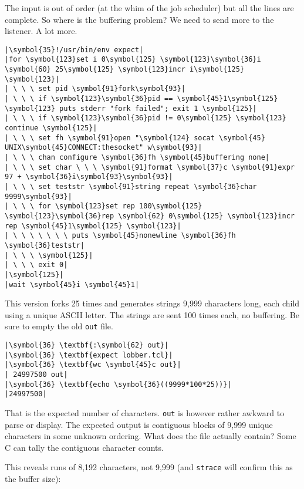 \documentclass[10pt,a4paper]{article}
\begin{document}
The input is out of order (at the whim of the job scheduler) but all the
lines are complete. So where is the buffering problem? We need to send
more to the listener. A lot more.

\begin{lstlisting}
|\symbol{35}!/usr/bin/env expect|
|for \symbol{123}set i 0\symbol{125} \symbol{123}\symbol{36}i \symbol{60} 25\symbol{125} \symbol{123}incr i\symbol{125} \symbol{123}|
| \ \ \ set pid \symbol{91}fork\symbol{93}|
| \ \ \ if \symbol{123}\symbol{36}pid == \symbol{45}1\symbol{125} \symbol{123} puts stderr "fork failed"; exit 1 \symbol{125}|
| \ \ \ if \symbol{123}\symbol{36}pid != 0\symbol{125} \symbol{123} continue \symbol{125}|
| \ \ \ set fh \symbol{91}open "\symbol{124} socat \symbol{45} UNIX\symbol{45}CONNECT:thesocket" w\symbol{93}|
| \ \ \ chan configure \symbol{36}fh \symbol{45}buffering none|
| \ \ \ set char \ \ \ \symbol{91}format \symbol{37}c \symbol{91}expr 97 + \symbol{36}i\symbol{93}\symbol{93}|
| \ \ \ set teststr \symbol{91}string repeat \symbol{36}char 9999\symbol{93}|
| \ \ \ for \symbol{123}set rep 100\symbol{125} \symbol{123}\symbol{36}rep \symbol{62} 0\symbol{125} \symbol{123}incr rep \symbol{45}1\symbol{125} \symbol{123}|
| \ \ \ \ \ \ \ puts \symbol{45}nonewline \symbol{36}fh \symbol{36}teststr|
| \ \ \ \symbol{125}|
| \ \ \ exit 0|
|\symbol{125}|
|wait \symbol{45}i \symbol{45}1|
\end{lstlisting}

This version forks 25 times and generates strings 9,999 characters long,
each child using a unique ASCII letter. The strings are sent 100 times
each, no buffering. Be sure to empty the old \texttt{out} file.

\begin{lstlisting}
|\symbol{36} \textbf{:\symbol{62} out}|
|\symbol{36} \textbf{expect lobber.tcl}|
|\symbol{36} \textbf{wc \symbol{45}c out}|
| 24997500 out|
|\symbol{36} \textbf{echo \symbol{36}((9999*100*25))}|
|24997500|
\end{lstlisting}

That is the expected number of characters. \texttt{out} is however
rather awkward to parse or display. The expected output is
contiguous blocks of 9,999 unique characters in some unknown
ordering. What does the file actually contain? Some C can tally the
contiguous character counts.



This reveals runs of 8,192 characters, not 9,999 (and \texttt{strace}
will confirm this as the buffer size):
\end{document}
